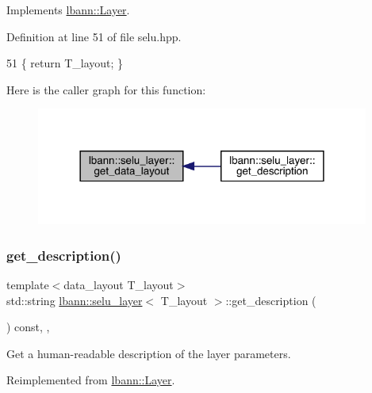 Implements \hyperlink{classlbann_1_1Layer_a5dfb66e81fc085997402a5e2241316bd}{lbann\+::\+Layer}.



Definition at line 51 of file selu.\+hpp.


\begin{DoxyCode}
51 \{ \textcolor{keywordflow}{return} T\_layout; \}
\end{DoxyCode}
Here is the caller graph for this function\+:\nopagebreak
\begin{figure}[H]
\begin{center}
\leavevmode
\includegraphics[width=310pt]{classlbann_1_1selu__layer_a02a03e8f426406619e48258f71feffd1_icgraph}
\end{center}
\end{figure}
\mbox{\label{classlbann_1_1selu__layer_a58e12f4297b2563718417d4acadea010}} 
\subsubsection{\texorpdfstring{get\+\_\+description()}{get\_description()}}
{\footnotesize\ttfamily template$<$data\+\_\+layout T\+\_\+layout$>$ \\
std\+::string \hyperlink{classlbann_1_1selu__layer}{lbann\+::selu\+\_\+layer}$<$ T\+\_\+layout $>$\+::get\+\_\+description (\begin{DoxyParamCaption}{ }\end{DoxyParamCaption}) const\hspace{0.3cm}{\ttfamily [inline]}, {\ttfamily [override]}, {\ttfamily [virtual]}}

Get a human-\/readable description of the layer parameters. 

Reimplemented from \hyperlink{classlbann_1_1Layer_acc0803d3428914ca1eb5988c4309174a}{lbann\+::\+Layer}.



